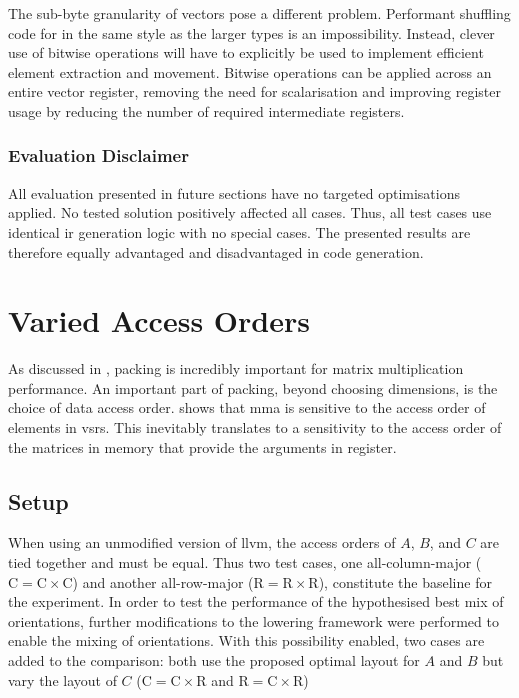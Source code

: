 \documentclass[\main/thesis.tex]{subfiles}
\begin{document}
The sub-byte granularity of  vectors pose a different problem.
Performant shuffling code for  in the same style as the larger types is an impossibility.
Instead, clever use of bitwise operations will have to explicitly be used to implement efficient element extraction and movement.
Bitwise operations can be applied across an entire vector register, removing the need for scalarisation and improving register usage by reducing the number of required intermediate registers.

\subsubsection{Evaluation Disclaimer}
All evaluation presented in future sections have no targeted optimisations applied.
No tested solution positively affected all cases.
Thus, all test cases use identical \gls{ir} generation logic with no special cases.
The presented results are therefore equally advantaged and disadvantaged in code generation.

\section{Varied Access Orders}
As discussed in , packing is incredibly important for matrix multiplication performance.
An important part of packing, beyond choosing dimensions, is the choice of data access order.
 shows that \gls{mma} is sensitive to the access order of elements in \glspl{vsr}.
This inevitably translates to a sensitivity to the access order of the matrices in memory that provide the arguments in register.

\subsection{Setup}
When using an unmodified version of \gls{llvm}, the access orders of $A$, $B$, and $C$ are tied together and must be equal.
Thus two test cases, one all-column-major ($\textrm{C} = \textrm{C} \times \textrm{C}$) and another all-row-major ($\textrm{R} = \textrm{R} \times \textrm{R}$), constitute the baseline for the experiment.
In order to test the performance of the hypothesised best mix of orientations, further modifications to the lowering framework were performed to enable the mixing of orientations.
With this possibility enabled, two cases are added to the comparison: both use the proposed optimal layout for $A$ and $B$ but vary the layout of $C$ ($\textrm{C} = \textrm{C} \times \textrm{R}$ and $\textrm{R} = \textrm{C} \times \textrm{R}$)
\end{document}
